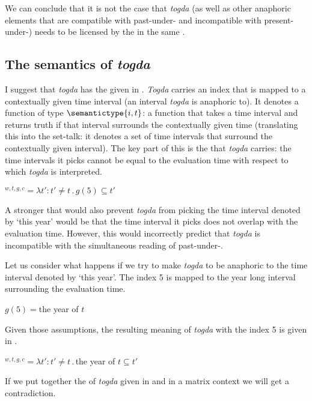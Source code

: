 \documentclass[output=paper,modfonts,newtxmath,hidelinks]{langscibook}
\begin{document}
\noindent We can conclude that it is not the case that \textit{togda} (as well as other anaphoric elements that are compatible with past-under- and incompatible with present-under-) needs to be licensed by the  in the same .

\subsection{The semantics of \textit{togda}}\label{20:s2.3}

I suggest that \textit{togda} has the  given in . \textit{Togda} carries an index that is mapped to a contextually given time interval (an interval \textit{togda} is anaphoric to). It denotes a function of type $\semantictype{i,t}$: a function that takes a time interval and returns truth if that interval surrounds the contextually given time (translating this into the set-talk: it denotes a set of time intervals that surround the contextually given interval). The key part of this  is the  that \textit{togda} carries: the time intervals it picks cannot be equal to the evaluation time with respect to which \textit{togda} is interpreted.

\ea {}$^{w,t,g,c}=\lambda t':t'\neq t\,.\,g(5)\subseteq t'$\label{20:ex20}
\z

\noindent A stronger  that would also prevent \textit{togda} from picking the time interval denoted by ‘this year’ would be that the time interval it picks does not overlap with the evaluation time. However, this would incorrectly predict that \textit{togda} is incompatible with the simultaneous reading of past-under-.

Let us consider what happens if we try to make \textit{togda} to be anaphoric to the time interval denoted by ‘this year’. The index 5 is mapped to the year long interval surrounding the evaluation time.

\ea $g(5)={}$the year of $t$\label{20:ex21}
\z

\noindent Given those assumptions, the resulting meaning of \textit{togda} with the index 5 is given in .

\ea {}$^{w,t,g,c}=\lambda t':t'\neq t\,.\,{}$the year of $t\subseteq t'$\label{20:ex22}
\z

\noindent If we put together the  of \textit{togda} given in  and  in a matrix context we will get a contradiction.
\end{document}
